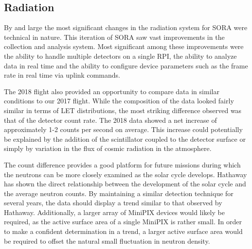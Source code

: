 \subsection{Radiation}
\label{sec:Radiation Results Discussion}
By and large the most significant changes in the radiation system for SORA were technical in nature. This iteration of SORA saw vast improvements in the collection and analysis system. Most significant among these improvements were the ability to handle multiple detectors on a single RPI, the ability to analyze data in real time and the ability to configure device parameters such as the frame rate in real time via uplink commands.

The 2018 flight also provided an opportunity to compare data in similar conditions to our 2017 flight. While the composition of the data looked fairly similar in terms of LET distributions, the most striking difference observed was that of the detector count rate. The 2018 data showed a net increase of approximately 1-2 counts per second on average. This increase could potentially be explained by the addition of the scintillator coupled to the detector surface or simply by variation in the flux of cosmic radiation in the atmosphere.

The count difference provides a good platform for future missions during which the neutrons can be more closely examined as the solar cycle develops. Hathaway \cite{SolarCycle} has shown the direct relationship between the development of the solar cycle and the average neutron counts. By maintaining a similar detection technique for several years, the data should display a trend similar to that observed by Hathaway. Additionally, a larger array of MiniPIX devices would likely be required, as the active surface area of a single MiniPIX is rather small. In order to make a confident determination in a trend, a larger active surface area would be required to offset the natural small fluctuation in neutron density.
